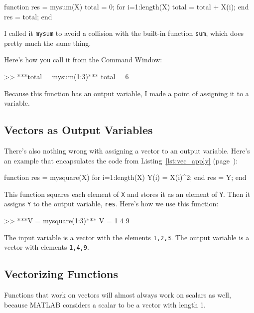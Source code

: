 \begin{code}
function res = mysum(X)
    total = 0;
    for i=1:length(X)
        total = total + X(i);
    end
    res = total;
end
\end{code}

I called it {\tt mysum} to avoid a collision with the built-in
function {\tt sum}, which does pretty much the same thing.


Here's how you call it from the Command Window:

\begin{code}
>> ***total = mysum(1:3)***
total = 6
\end{code}

Because this function has an output variable, I made a
point of assigning it to a variable.



\subsection{Vectors as Output Variables}

There's also nothing wrong with assigning a vector to an output
variable. Here's an example that encapsulates the code from
Listing~\ref{lst:vec_apply} (page~\pageref{lst:vec_apply}):

\begin{code}
function res = mysquare(X)
    for i=1:length(X)
        Y(i) = X(i)^2;
    end
    res = Y;
end
\end{code}

This function squares each element of {\tt X} and stores it as an element of {\tt Y}.  Then it assigns {\tt Y} to the output variable, {\tt res}.  Here's how we use this function:

\begin{code}
>> ***V = mysquare(1:3)***
V = 1     4     9
\end{code}

The input variable is a vector with the elements {\tt 1,2,3}.  The output variable is a vector with elements {\tt 1,4,9}.




\subsection{Vectorizing Functions}

Functions that work on vectors will almost always work on scalars
as well, because MATLAB considers a scalar to be a vector with
length 1.

